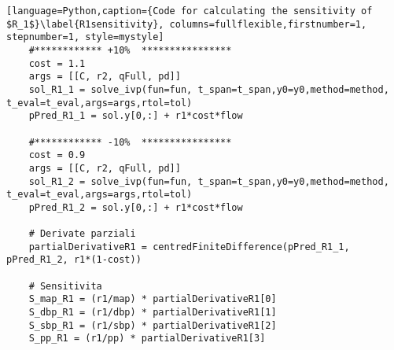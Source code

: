 \begin{lstlisting}[language=Python,caption={Code for calculating the sensitivity of $R_1$}\label{R1sensitivity}, columns=fullflexible,firstnumber=1, stepnumber=1, style=mystyle]
    #************ +10%  ****************
    cost = 1.1
    args = [[C, r2, qFull, pd]]
    sol_R1_1 = solve_ivp(fun=fun, t_span=t_span,y0=y0,method=method, t_eval=t_eval,args=args,rtol=tol)
    pPred_R1_1 = sol.y[0,:] + r1*cost*flow
    
    #************ -10%  ****************
    cost = 0.9
    args = [[C, r2, qFull, pd]]
    sol_R1_2 = solve_ivp(fun=fun, t_span=t_span,y0=y0,method=method, t_eval=t_eval,args=args,rtol=tol)
    pPred_R1_2 = sol.y[0,:] + r1*cost*flow
    
    # Derivate parziali
    partialDerivativeR1 = centredFiniteDifference(pPred_R1_1, pPred_R1_2, r1*(1-cost))
    
    # Sensitivita
    S_map_R1 = (r1/map) * partialDerivativeR1[0]
    S_dbp_R1 = (r1/dbp) * partialDerivativeR1[1]
    S_sbp_R1 = (r1/sbp) * partialDerivativeR1[2]
    S_pp_R1 = (r1/pp) * partialDerivativeR1[3]
\end{lstlisting}